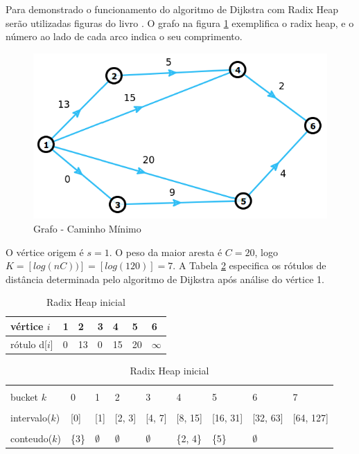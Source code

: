 Para demonstrado o funcionamento do algoritmo de Dijkstra com Radix Heap serão utilizadas figuras do livro \cite{bookahuja}.
O grafo na figura \ref{fig:grafoRadix} exemplifica o radix heap, e o número ao lado de cada arco indica o seu comprimento.
\FloatBarrier
\begin{figure}[htbp]
\centering
 \includegraphics[width=.65\textwidth]{chapters/fig/grafoRadix.png}
\caption{Grafo - Caminho Mínimo}
\label{fig:grafoRadix}
\end{figure}
\FloatBarrier
O vértice origem é $s = 1$. O peso da maior aresta é $C = 20$, logo $K = [log(nC))] = [log(120)] = 7$.
A Tabela \ref{tab:initialradixheap} especifica os rótulos de distância determinada pelo algoritmo de Dijkstra
após análise do vértice 1.
\FloatBarrier
\begin{table}[htbp]
	\centering
	\begin{tabular}{l l l l l l l}
	\toprule
	vértice $i$ & 1 & 2 & 3 & 4 & 5 & 6\\
	\midrule
	rótulo d[$i$] & 0 & 13 & 0 & 15 & 20 & $\infty$ \\
	\bottomrule
	\end{tabular}
	
	\centering
	\begin{tabular}{l l l l l l l l l}
	\toprule
	\\bucket $k$ & 0 & 1 & 2 & 3 & 4 & 5 & 6 & 7\\
	\midrule
	\\intervalo($k$) & [0] & [1] & [2, 3] & [4, 7] & [8, 15] & [16, 31] & [32, 63] & [64, 127]\\
	\\conteudo($k$) & \{3\} & $\emptyset$ & $\emptyset$ & $\emptyset$ & \{2, 4\} & \{5\} & $\emptyset$ & \\
	\bottomrule
	\end{tabular}
\caption{Radix Heap inicial}
 \label{tab:initialradixheap}
\end{table}

